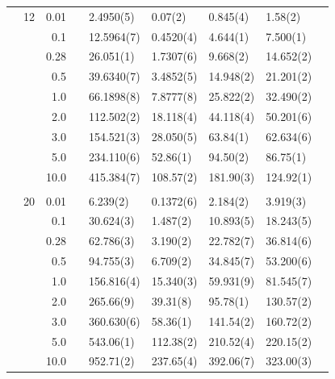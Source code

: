 \begin{table}[H]
\begin{tabularx}{\textwidth}{R{1cm}rrcR{2.3cm}R{2.3cm}R{2.3cm}R{2.3cm}R{1cm}}
		&12 & 0.01 && 2.4950(5) & 0.07(2) & 0.845(4) & 1.58(2) \\
		&& 0.1 && 12.5964(7) & 0.4520(4) & 4.644(1) & 7.500(1) \\
		&& 0.28 && 26.051(1) & 1.7307(6) & 9.668(2) & 14.652(2) \\
		&& 0.5 && 39.6340(7) & 3.4852(5) & 14.948(2) & 21.201(2) \\
		&& 1.0 && 66.1898(8) & 7.8777(8) & 25.822(2) & 32.490(2) \\
		&& 2.0 && 112.502(2) & 18.118(4) & 44.118(4) & 50.201(6) \\
		&& 3.0 && 154.521(3) & 28.050(5) & 63.84(1) & 62.634(6) \\ 
		&& 5.0 && 234.110(6) & 52.86(1) & 94.50(2) & 86.75(1) \\
		&& 10.0 && 415.384(7) & 108.57(2) & 181.90(3) & 124.92(1) \\
		\hline \\
		
		&20 & 0.01 && 6.239(2) & 0.1372(6) & 2.184(2) & 3.919(3) \\
		&& 0.1 && 30.624(3) & 1.487(2) & 10.893(5) & 18.243(5) \\
		&& 0.28 && 62.786(3) & 3.190(2) & 22.782(7) & 36.814(6) \\
		&& 0.5 && 94.755(3) & 6.709(2) & 34.845(7) & 53.200(6) \\
		&& 1.0 && 156.816(4) & 15.340(3) & 59.931(9) & 81.545(7) \\
		&& 2.0 && 265.66(9) & 39.31(8) & 95.78(1) & 130.57(2) \\
		&& 3.0 && 360.630(6) & 58.36(1) & 141.54(2) & 160.72(2) \\ 
		&& 5.0 && 543.06(1) & 112.38(2) & 210.52(4) & 220.15(2) \\
		&& 10.0 && 952.71(2) & 237.65(4) & 392.06(7) & 323.00(3) \\
		\hline\hline
	\end{tabularx}
\end{table}


